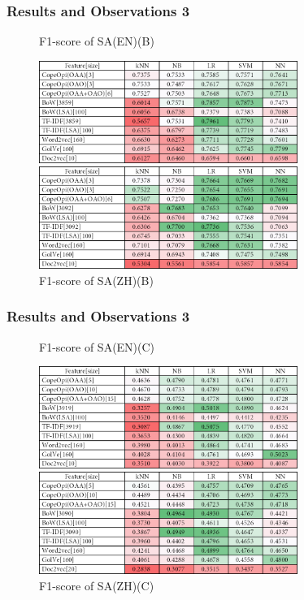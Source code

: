 \documentclass[mathserif]{beamer}
\newcommand\expfigvspace{-2.5ex}
\begin{document}
\begin{frame}
\frametitle{Results and Observations 3}
	\vspace{\expfigvspace}
	\begin{figure}
	\centering
	\caption{F1-score of SA(EN)(B)}
	\includegraphics[width=0.75\textwidth]{./figure/01A2.png}
	\caption{F1-score of SA(ZH)(B)}
	\includegraphics[width=0.75\textwidth]{./figure/02A2.png}
	\end{figure}
\end{frame}
\begin{frame}
\frametitle{Results and Observations 3}
	\vspace{\expfigvspace}
	\begin{figure}
	\centering
	\caption{F1-score of SA(EN)(C)}
	\includegraphics[width=0.75\textwidth]{./figure/01A3.png}
	\caption{F1-score of SA(ZH)(C)}
	\includegraphics[width=0.75\textwidth]{./figure/02A3.png}
	\end{figure}
\end{frame}
\end{document}
